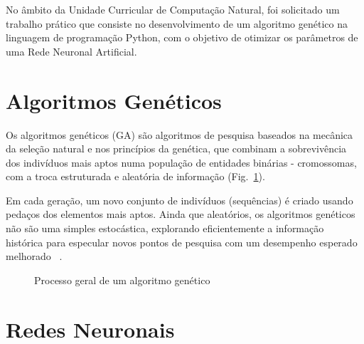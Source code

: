 No âmbito da Unidade Curricular de Computação Natural, foi solicitado um trabalho prático que consiste no desenvolvimento de um algoritmo genético na linguagem de programação Python, com o objetivo de otimizar os parâmetros de uma Rede Neuronal Artificial.

\section{Algoritmos Genéticos}\label{sec:gen_algs}

Os algoritmos genéticos (GA) são algoritmos de pesquisa baseados na mecânica da seleção natural e nos princípios da genética, que combinam a sobrevivência dos indivíduos mais aptos numa população de entidades binárias - cromossomas, com a troca estruturada e aleatória de informação (Fig.~\ref{fig:ea_flowchart}). 

Em cada geração, um novo conjunto de indivíduos (sequências) é criado usando pedaços dos elementos mais aptos.
Ainda que aleatórios, os  algoritmos genéticos não são uma simples  estocástica, explorando eficientemente a informação histórica para especular novos pontos de pesquisa com um desempenho esperado melhorado ~\cite{Goldberg1989GeneticLearning}.

\begin{figure}[htbp]
\centering
{}
\caption{Processo geral de um algoritmo genético}
\label{fig:ea_flowchart}
\end{figure}

\section{Redes Neuronais}\label{sec:neural_nets}

